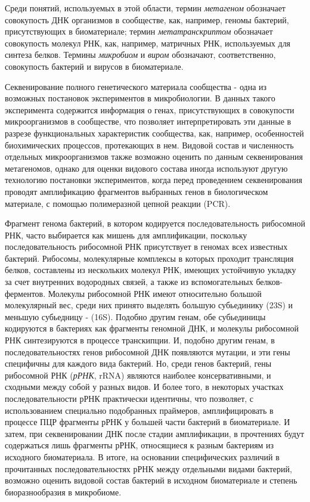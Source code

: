 Среди понятий, используемых в этой области, термин \textit{метагеном} обозначает совокупость ДНК организмов в сообществе, как, например, геномы бактерий, присутствующих в биоматериале; термин \textit{метатранскриптом} обозначает совокупость молекул РНК, как, например, матричных РНК, используемых для синтеза белков. Термины \textit{микробиом} и \textit{виром} обозначают, соответственно, совокупость бактерий и вирусов в биоматериале.

Секвенирование полного генетического материала сообщества - одна из возможных постановок экспериментов в микробиологии. В данных такого эксперимента содержится информация о генах, присутствующих в совокупости микроорганизмов в сообществе, что позволяет интерпретировать эти данные в разрезе функциональных характеристик сообщества, как, например, особенностей биохимических процессов, протекающих в нем. Видовой состав и численность отдельных микроорганизмов также возможно оценить по данным секвенирования метагеномов, однако для оценки видового состава иногда используют другую технологию постановки экспериментов, когда перед проведением секвенирования проводят амплификацию фрагментов выбранных генов в биологическом материале, с помощью полимеразной цепной реакции (PCR). 

Фрагмент генома бактерий, в котором кодируется последовательность рибосомной РНК, часто выбирается как мишень для амплификации, поскольку последовательность рибосомной РНК присутствует в геномах всех известных бактерий. Рибосомы, молекулярные комплексы в которых проходит трансляция белков, составлены из нескольких молекул РНК, имеющих устойчивую укладку за счет внутренних водородных связей, а также из вспомогательных белков-ферментов. Молекулы рибосомной РНК имеют относительно большой молекулярный вес, среди них принято выделять большую субьединику (23S) и меньшую субьедницу - (16S). Подобно другим генам, обе субьединицы  кодируются в бактериях как фрагменты геномной ДНК, и молекулы рибосомной РНК синтезируются в процессе транскипции. И, подобно другим генам, в последовательностях генов рибосомной ДНК появляются мутации, и эти гены специфичны для каждого вида бактерий. Но, среди генов бактерий, гены рибосомной РНК (\textit{рРНК}, rRNA) являются наиболее консервативными, и сходными между собой у разных видов. И более того, в некоторых участках последовательности рРНК практически идентичны, что позволяет, с использованием специально подобранных праймеров, амплифицировать в процессе ПЦР фрагменты рРНК у большей части бактерий в биоматериале. И затем, при секвенировании ДНК после стадии амплификации, в прочтениях будут содержаться лишь фрагменты рРНК, относящиеся к разным бактериям из исходного биоматериала. В итоге, на основании специфических различий в прочитанных последовательностях рРНК между отдельными видами бактерий, возможно оценить видовой состав бактерий в исходном биоматериале и степень биоразнообразия в микробиоме.

